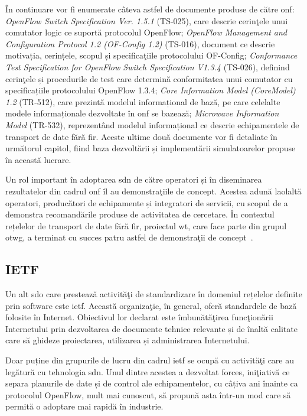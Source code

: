 În continuare vor fi enumerate câteva astfel de documente produse de către \gls{onf}: \textit{OpenFlow Switch Specification Ver. 1.5.1} (TS-025), care descrie cerinţele unui comutator logic ce suportă protocolul OpenFlow; \textit{OpenFlow Management	and	Configuration Protocol 1.2 (OF-Config 1.2)} (TS-016), document ce descrie motivația, cerințele, scopul și specificaţiile protocolului OF-Config; \textit{Conformance Test Specification for OpenFlow Switch Specification V1.3.4} (TS-026), definind cerinţele și procedurile de test care determină conformitatea unui comutator cu specificațiile protocolului OpenFlow 1.3.4; \textit{Core Information Model (CoreModel) 1.2} (TR-512), care prezintă modelul informațional de bază, pe care celelalte modele informaționale dezvoltate în \gls{onf} se bazează; \textit{Microwave Information Model} (TR-532), reprezentând modelul informațional ce descrie echipamentele de transport de date fără fir. Aceste ultime două documente vor fi detaliate în următorul capitol, fiind baza dezvoltării și implementării simulatoarelor propuse în această lucrare.

Un rol important în adoptarea \gls{sdn} de către operatori și în diseminarea rezultatelor din cadrul \gls{onf} îl au demonstraţiile de concept. Acestea adună laolaltă operatori, producători de echipamente și integratori de servicii, cu scopul de a demonstra recomandările produse de activitatea de cercetare. În contextul rețelelor de transport de date fără fir, proiectul \gls{wt}, care face parte din grupul \gls{otwg}, a terminat cu succes patru astfel de demonstraţii de concept~\cite{onf2015_poc1, onf2016_poc2, onf2016_poc3}.

\subsection{IETF}

Un alt \gls{sdo} care prestează activităţi de standardizare în domeniul rețelelor definite prin software este \gls{ietf}. Această organizaţie, în general, oferă standardele de bază folosite în Internet. Obiectivul lor declarat este îmbunătăţirea funcţionării Internetului prin dezvoltarea de documente tehnice relevante și de înaltă calitate care să ghideze proiectarea, utilizarea și administrarea Internetului.

Doar puține din grupurile de lucru din cadrul \gls{ietf} se ocupă cu activităţi care au legătură cu tehnologia \gls{sdn}. Unul dintre acestea a dezvoltat \gls{forces}, iniţiativă ce separa planurile de date și de control ale echipamentelor, cu câțiva ani înainte ca protocolul OpenFlow, mult mai cunoscut, să propună asta într-un mod care să permită o adoptare mai rapidă în industrie.

